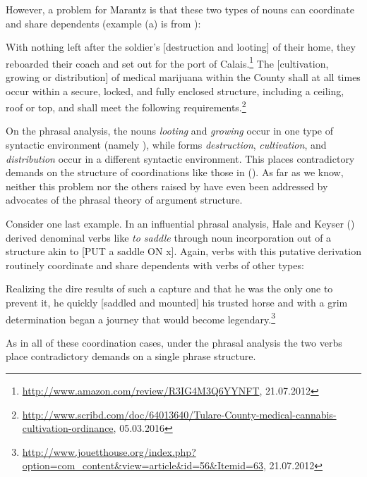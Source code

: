 \addlines
However, a problem for Marantz is that these two types of nouns can coordinate and share dependents (example
(a) is from ): 

\eal
\ex With nothing left after the soldier's [destruction and looting] of their home, they reboarded
their coach and set out for the port of Calais.\footnote{\url{http://www.amazon.com/review/R3IG4M3Q6YYNFT}, 21.07.2012}
\ex  The [cultivation, growing or distribution] of medical marijuana within the County shall at all
times occur within a secure, locked, and fully enclosed structure, including a ceiling, roof or top,
and shall meet the following
requirements.\footnote{%
\href{http://www.scribd.com/doc/64013640/Tulare-County-medical-cannabis-cultivation-ordinance}{http://www.scribd.com/doc/64013640/Tulare-County-medical-cannabis-cultivation-ordinance}, 05.03.2016}  
\zl

On the phrasal analysis, the nouns \emph{looting} and \emph{growing} occur in one type
of syntactic environment (namely \vP), while forms \emph{destruction}, \emph{cultivation}, 
 and \emph{distribution} occur in a different syntactic environment.  This places contradictory
demands on the structure of coordinations like those in ().  As far as we know, neither this problem nor
the others raised by \citet{Wechsler2008a} have even been addressed by advocates of the phrasal theory of
argument structure.    

Consider one last example.  In an influential phrasal analysis, Hale and Keyser (\citeyear{HK93a-u})
derived denominal verbs like \emph{to saddle} through noun incorporation out of a structure akin to
[PUT a saddle ON x].  Again, verbs with this putative derivation routinely coordinate and share
dependents with verbs of other types: 

\ea
Realizing the dire results of such a capture and that he was the only one to prevent it, he quickly
[saddled and mounted] his trusted horse and with a grim determination began a journey that would
become legendary.\footnote{\url{http://www.jouetthouse.org/index.php?option=com_content&view=article&id=56&Itemid=63},
  21.07.2012}  
\z

\noindent
As in all of these \xnull coordination cases, under the phrasal analysis the two verbs place
contradictory demands on a single phrase structure.   

